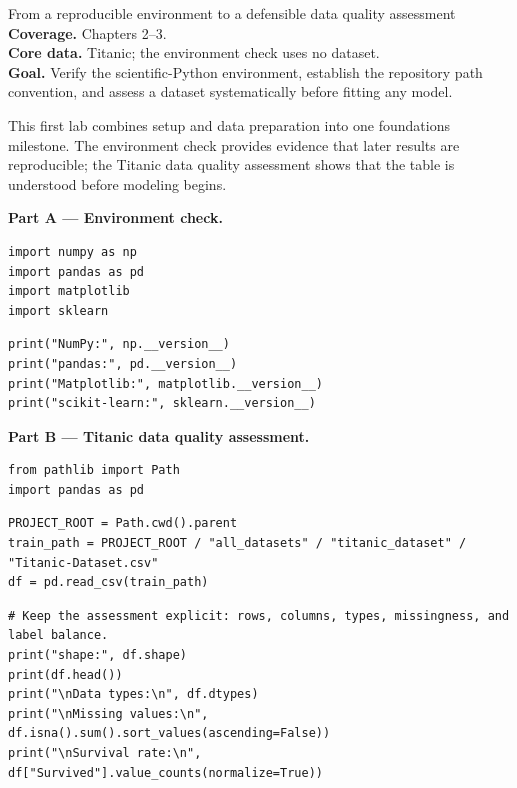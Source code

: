 
\begin{labproject}{From a reproducible environment to a defensible data quality assessment}
\textbf{Coverage.} Chapters 2--3.\\
\textbf{Core data.} Titanic; the environment check uses no dataset.\\
\textbf{Goal.} Verify the scientific-Python environment, establish the repository path convention, and assess a dataset systematically before fitting any model.

\begin{labmode}
This first lab combines setup and data preparation into one foundations milestone. The environment check provides evidence that later results are reproducible; the Titanic data quality assessment shows that the table is understood before modeling begins.
\end{labmode}

\medskip\noindent\textbf{Part A --- Environment check.}\par

\begin{lstlisting}[style=mlpython]
import numpy as np
import pandas as pd
import matplotlib
import sklearn
\end{lstlisting}

\begin{lstlisting}[style=mlpython]
print("NumPy:", np.__version__)
print("pandas:", pd.__version__)
print("Matplotlib:", matplotlib.__version__)
print("scikit-learn:", sklearn.__version__)
\end{lstlisting}



\medskip\noindent\textbf{Part B --- Titanic data quality assessment.}\par

\begin{lstlisting}[style=mlpython]
from pathlib import Path
import pandas as pd
\end{lstlisting}

\begin{lstlisting}[style=mlpython]
PROJECT_ROOT = Path.cwd().parent
train_path = PROJECT_ROOT / "all_datasets" / "titanic_dataset" / "Titanic-Dataset.csv"
df = pd.read_csv(train_path)
\end{lstlisting}

\begin{lstlisting}[style=mlpython]
# Keep the assessment explicit: rows, columns, types, missingness, and label balance.
print("shape:", df.shape)
print(df.head())
print("\nData types:\n", df.dtypes)
print("\nMissing values:\n", df.isna().sum().sort_values(ascending=False))
print("\nSurvival rate:\n", df["Survived"].value_counts(normalize=True))
\end{lstlisting}


\end{labproject}
